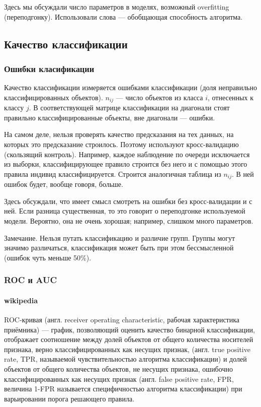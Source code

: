 Здесь мы обсуждали число параметров в моделях, возможный overfitting (переподгонку).
Использовали слова --- обобщающая способность алгоритма.

\subsection{Качество классификации}


\subsubsection{Ошибки класификации}

Качество классификации измеряется ошибками классификации (доля неправильно классифицированных объектов).
$n_{ij}$ --- число объектов из класса $i$, отнесенных к классу $j$. В соответствующей матрице классификации
на диагонали стоят правильно классифицированные объекты, вне диагонали --- ошибки.

На самом деле, нельзя проверять качество предсказания на тех данных, на которых это предсказание строилось.
Поэтому используют кросс-валидацию (скользящий контроль).
Например, каждое наблюдение по очереди исключается из выборки, классифицирующее правило строится без него и с
 помощью этого правила индивид классифицируется. Строится аналогичная таблица из $n_{ij}$. В ней ошибок будет,
 вообще говоря, больше.

 Здесь обсуждали, что имеет смысл смотреть на ошибки без кросс-валидации и с ней. Если разница существенная, то
 это говорит о переподгонке используемой модели. Вероятно, она не очень хорошая; например, слишком много
 параметров.

Замечание. Нельзя путать классификацию и различие групп. Группы могут значимо различаться, классификация может
быть при этом бессмысленной
(ошибок чуть меньше 50\%).

\subsubsection{ROC и AUC}

\paragraph{wikipedia}

ROC-кривая (англ. receiver operating characteristic, рабочая характеристика приёмника) --- график, позволяющий оценить качество бинарной классификации, отображает соотношение между долей объектов от общего количества носителей признака, верно классифицированных как несущих признак, (англ. true positive rate, TPR, называемой чувствительностью алгоритма классификации) и долей объектов от общего количества объектов, не несущих признака, ошибочно классифицированных как несущих признак (англ. false positive rate, FPR, величина 1-FPR называется специфичностью алгоритма классификации) при варьировании порога решающего правила.

